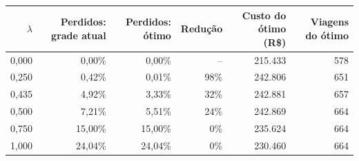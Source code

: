 \begin{tabular}{rrrrrr}
\toprule
$\lambda$ & Perdidos: grade atual & Perdidos: ótimo & Redução & Custo do ótimo (R\$) & Viagens do ótimo \\
\midrule
0{,}000 & 0{,}00\% & 0{,}00\% & -- & 215.433 & 578 \\
0{,}250 & 0{,}42\% & 0{,}01\% & 98\% & 242.806 & 651 \\
0{,}435 & 4{,}92\% & 3{,}33\% & 32\% & 242.881 & 657 \\
0{,}500 & 7{,}21\% & 5{,}51\% & 24\% & 242.869 & 664 \\
0{,}750 & 15{,}00\% & 15{,}00\% & 0\% & 235.624 & 664 \\
1{,}000 & 24{,}04\% & 24{,}04\% & 0\% & 230.460 & 664 \\
\bottomrule
\end{tabular}
